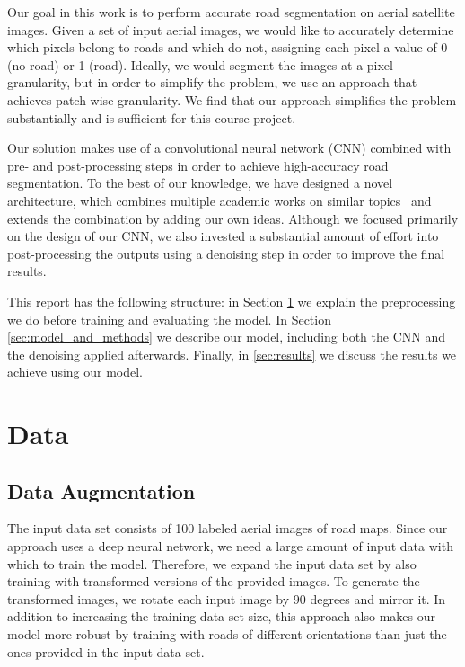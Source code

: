 \documentclass[10pt,conference,compsocconf]{IEEEtran}
\begin{document}
Our goal in this work is to perform accurate road segmentation on aerial
satellite images. Given a set of input aerial images, we would like to
accurately determine which pixels belong to roads and which do not, assigning
each pixel a value of 0 (no road) or 1 (road). Ideally, we would segment the
images at a pixel granularity, but in order to simplify the problem, we use an
approach that achieves patch-wise granularity. We find that our approach
simplifies the problem substantially and is sufficient for this course
project. 

Our solution makes use of a convolutional neural network (CNN) combined with
pre- and post-processing steps in order to achieve high-accuracy road
segmentation.  To the best of our knowledge, we have designed a novel
architecture, which combines multiple academic works on similar
topics~\cite{mthesis,Mnih2010,vgg,xavier} and extends the combination by adding
our own ideas. Although we focused primarily on the design of our CNN, we also
invested a substantial amount of effort into post-processing the outputs using
a denoising step in order to improve the final results.

This report has the following structure: in Section \ref{sec:Data} we explain
the preprocessing we do before training and evaluating the model. In Section
\ref{sec:model_and_methods} we describe our model, including both the CNN and
the denoising applied afterwards. Finally, in \ref{sec:results} we discuss the
results we achieve using our model.


\section{Data}
\label{sec:Data}

\subsection{Data Augmentation}
\label{sec:data_aug}
The input data set consists of 100 labeled aerial images of road maps. Since
our approach uses a deep neural network, we need a large amount of input data
with which to train the model. Therefore, we expand the input data set by also
training with transformed versions of the provided images. To generate the
transformed images, we rotate each input image by 90 degrees and mirror it. In
addition to increasing the training data set size, this approach also makes our
model more robust by training with roads of different orientations than just
the ones provided in the input data set. 
\end{document}
